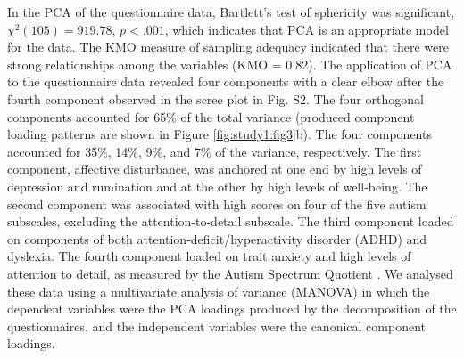 In the PCA of the questionnaire data, Bartlett’s test of sphericity was significant,
\(\chi^{2}(105) = 919.78\), 
\(\mathit{p} < .001\), 
which indicates that PCA is an appropriate model for the data. The KMO measure of sampling adequacy indicated that there were strong relationships among the variables (KMO = 0.82). The application of PCA to the questionnaire data revealed four components with a clear elbow after the fourth component observed in the scree plot in Fig. S2. The four orthogonal components accounted for 65\% of the total variance (produced component loading patterns are shown in Figure \ref{fig:study1:fig3}b). The four components accounted for 35\%, 14\%, 9\%, and 7\% of the variance, respectively. The first component, affective disturbance, was anchored at one end by high levels of depression and rumination and at the other by high levels of well-being. The second component was associated with high scores on four of the five autism subscales, excluding the attention-to-detail subscale. The third component loaded on components of both attention-deficit/hyperactivity disorder (ADHD) and dyslexia. The fourth component loaded on trait anxiety and high levels of attention to detail, as measured by the Autism Spectrum Quotient \cite{Baron-Cohen2001}. We analysed these data using a multivariate analysis of variance (MANOVA) in which the dependent variables were the PCA loadings produced by the decomposition of the questionnaires, and the independent variables were the canonical component loadings.
